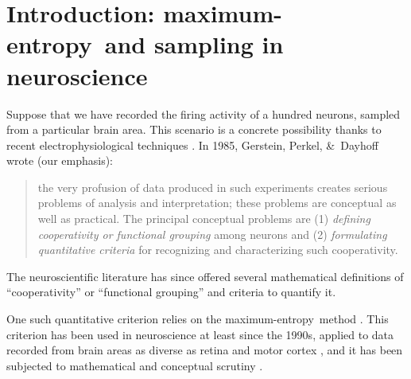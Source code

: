 \documentclass{article}
\title{\pdftitle}
\author{
  P.G.L. Porta Mana\\\texttt{piero.mana@ntnu.org}
  \And
  V. Rostami\\\texttt{v.rostami@fz-juelich.de}
  \AND
  E. Torre\\\texttt{torre@ibk.baug.ethz.ch}
    \And
Y. Roudi\\\texttt{yasser.roudi@ntnu.no}
}
\theoremstyle{remark}
\theoremstyle{innote}
\newcommand*{\citep}{\parencites}
\renewcommand*{\cite}{\citep}
\newcommand*{\amp}{\&}
\renewcommand*{\|}{\mathpunct{|}}%
\theoremstyle{simple}
\newcommand*{\me}{maximum-entropy}
\begin{document}

\maketitle

\begin{abstract}
  This note shows that the \me\ method can be applied to a representative
  sample from a neuronal population along two different routes: (1) apply
  to the sample; or (2) apply to the population and marginalize to the
  sample. These two routes give inequivalent results. Which route should be
  chosen? Some arguments are presented in favour of the second. The note
  also touches upon probability formulae of representative sampling and
  discusses their possible meanings, a discussion that may be useful for
   sampling problems in neuroscience.
\end{abstract}

\section{Introduction: \me\ and sampling in neuroscience}

Suppose that we have recorded the firing activity of a hundred neurons,
sampled from a particular brain area. This scenario is a concrete
possibility thanks to recent electrophysiological techniques
\cite{berenyietal2014}. In 1985, Gerstein, Perkel, \amp\ Dayhoff wrote (our
emphasis):
\begin{quote}
  the very profusion of data produced in such experiments creates serious
  problems of analysis and interpretation; these problems are conceptual as
  well as practical. The principal conceptual problems are (1)
  \emph{defining cooperativity or functional grouping} among neurons and
  (2) \emph{formulating quantitative criteria} for recognizing and
  characterizing such cooperativity. \cite{gersteinetal1985}
\end{quote}
The neuroscientific literature has since offered several mathematical
definitions of \enquote{cooperativity} or \enquote{functional grouping} and
criteria to quantify it.

One such quantitative criterion relies on the \me\ method
\cite{jaynes1957,jaynes1963,sivia1996_r2006,meadetal1984}. This criterion
has been used in neuroscience at least since the 1990s, applied to data
recorded from brain areas as diverse as retina and motor cortex
\cite{mackay1991,martignonetal1995,bohteetal2000,amarietal2003,schneidmanetal2006,shlensetal2006,mackeetal2009b,roudietal2009c,tkaciketal2009,gerwinnetal2009,mackeetal2011,mackeetal2011b,ganmoretal2011,granotatedgietal2013,tkaciketal2014b,moraetal2015,shimazakietal2015},
and it has been subjected to mathematical and conceptual scrutiny
\cite{tkaciketal2006,roudietal2009,roudietal2009b,barreiroetal2010b,mackeetal2013,rostamietal2016_r2017}.
\end{document}
